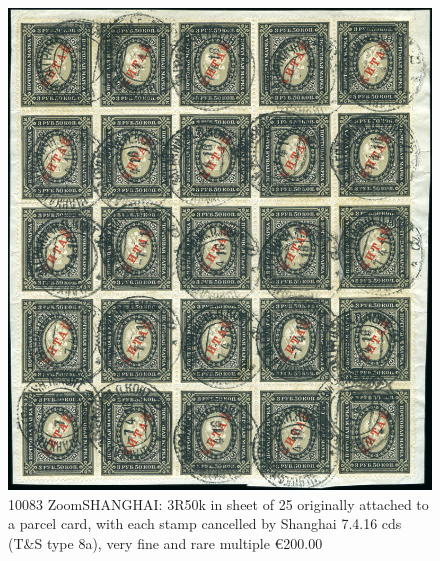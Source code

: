 \begin{figure}[htbp]
\centering
\includegraphics[width=.95\textwidth]{../russian-post-offices-in-china/10083.jpg}
\caption{
10083		ZoomSHANGHAI: 3R50k in sheet of 25 originally 
attached to a parcel card, with each stamp cancelled by Shanghai
7.4.16 cds (T\&S type 8a), very fine and rare multiple
\euro 200.00 
}  
\end{figure}            
            
